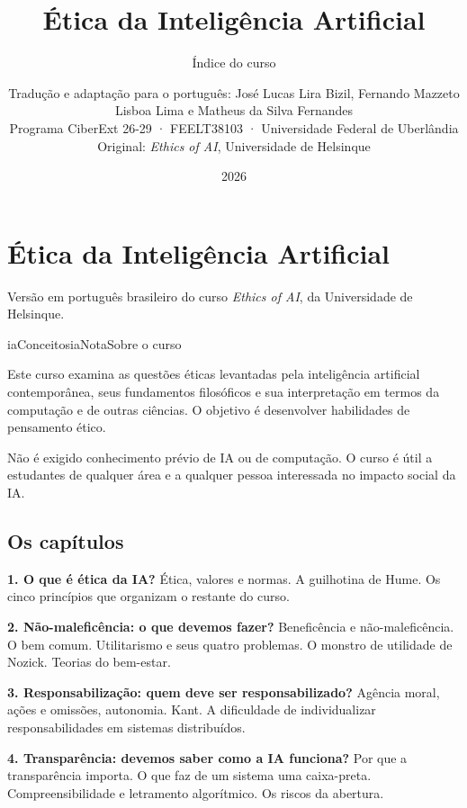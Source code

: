 \documentclass[
  11pt,
]{article}
\title{Ética da Inteligência Artificial}
\subtitle{Índice do curso}
\author{Tradução e adaptação para o português: José Lucas Lira Bizil,
Fernando Mazzeto Lisboa Lima e Matheus da Silva Fernandes\\
Programa CiberExt 26-29 · FEELT38103 · Universidade Federal de
Uberlândia\\
Original: \emph{Ethics of AI}, Universidade de Helsinque}
\date{2026}
\newenvironment{nota}[1][Nota]{\begin{iabox}{iaConceitos}{iaNota}{#1}}{\end{iabox}}
\begin{document}
\maketitle

{
\hypersetup{linkcolor=iaConceitos}
\setcounter{tocdepth}{2}
\tableofcontents
}
\hypertarget{uxe9tica-da-inteliguxeancia-artificial}{%
\section{Ética da Inteligência
Artificial}\label{uxe9tica-da-inteliguxeancia-artificial}}

Versão em português brasileiro do curso \emph{Ethics of AI}, da
Universidade de Helsinque.

\begin{nota}[Sobre o curso]

Este curso examina as questões éticas levantadas pela inteligência
artificial contemporânea, seus fundamentos filosóficos e sua
interpretação em termos da computação e de outras ciências. O objetivo é
desenvolver habilidades de pensamento ético.

Não é exigido conhecimento prévio de IA ou de computação. O curso é útil
a estudantes de qualquer área e a qualquer pessoa interessada no impacto
social da IA.

\end{nota}

\hypertarget{os-capuxedtulos}{%
\subsection{Os capítulos}\label{os-capuxedtulos}}

\textbf{1. O que é ética da IA?} Ética, valores e normas. A guilhotina
de Hume. Os cinco princípios que organizam o restante do curso.

\textbf{2. Não-maleficência: o que devemos fazer?} Beneficência e
não-maleficência. O bem comum. Utilitarismo e seus quatro problemas. O
monstro de utilidade de Nozick. Teorias do bem-estar.

\textbf{3. Responsabilização: quem deve ser responsabilizado?} Agência
moral, ações e omissões, autonomia. Kant. A dificuldade de
individualizar responsabilidades em sistemas distribuídos.

\textbf{4. Transparência: devemos saber como a IA funciona?} Por que a
transparência importa. O que faz de um sistema uma caixa-preta.
Compreensibilidade e letramento algorítmico. Os riscos da abertura.
\end{document}
